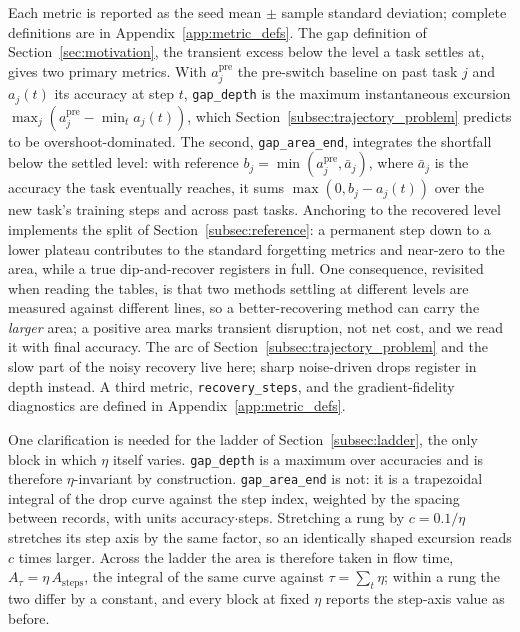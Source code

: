 Each metric is reported as the seed mean $\pm$ sample standard deviation; complete definitions are in Appendix~\ref{app:metric_defs}. The gap definition of Section~\ref{sec:motivation}, the transient excess below the level a task settles at, gives two primary metrics. With $a_j^{\text{pre}}$ the pre-switch baseline on past task $j$ and $a_j(t)$ its accuracy at step $t$, \texttt{gap\_depth} is the maximum instantaneous excursion $\max_j (a_j^{\text{pre}} - \min_t a_j(t))$, which Section~\ref{subsec:trajectory_problem} predicts to be overshoot-dominated. The second, \texttt{gap\_area\_end}, integrates the shortfall below the settled level: with reference $b_j = \min(a_j^{\text{pre}}, \bar{a}_j)$, where $\bar{a}_j$ is the accuracy the task eventually reaches, it sums $\max(0, b_j - a_j(t))$ over the new task's training steps and across past tasks. Anchoring to the recovered level implements the split of Section~\ref{subsec:reference}: a permanent step down to a lower plateau contributes to the standard forgetting metrics and near-zero to the area, while a true dip-and-recover registers in full. One consequence, revisited when reading the tables, is that two methods settling at different levels are measured against different lines, so a better-recovering method can carry the \emph{larger} area; a positive area marks transient disruption, not net cost, and we read it with final accuracy. The arc of Section~\ref{subsec:trajectory_problem} and the slow part of the noisy recovery live here; sharp noise-driven drops register in depth instead. A third metric, \texttt{recovery\_steps}, and the gradient-fidelity diagnostics are defined in Appendix~\ref{app:metric_defs}.

One clarification is needed for the ladder of Section~\ref{subsec:ladder}, the only block in which $\eta$ itself varies. \texttt{gap\_depth} is a maximum over accuracies and is therefore $\eta$-invariant by construction. \texttt{gap\_area\_end} is not: it is a trapezoidal integral of the drop curve against the step index, weighted by the spacing between records, with units accuracy${\cdot}$steps. Stretching a rung by $c = 0.1/\eta$ stretches its step axis by the same factor, so an identically shaped excursion reads $c$ times larger. Across the ladder the area is therefore taken in flow time, $A_\tau = \eta\,A_{\text{steps}}$, the integral of the same curve against $\tau = \sum_t \eta$; within a rung the two differ by a constant, and every block at fixed $\eta$ reports the step-axis value as before.

